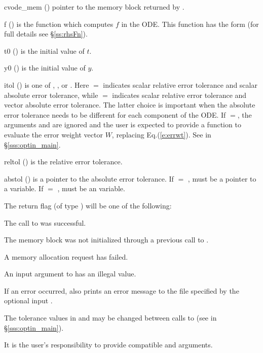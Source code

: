 {
  \begin{args}
  \item[cvode\_mem] ()
    pointer to the {\cvode} memory block returned by .
  \item[f] ()
    is the {\C} function which computes $f$ in the ODE. This function has the 
    form  (for full details see \S\ref{ss:rhsFn}).
  \item[t0] ()
    is the initial value of $t$.
  \item[y0] ()
    is the initial value of $y$. 
  \item[itol] () 
    is one of , , or . Here  $=$ 
    indicates scalar relative error tolerance and scalar absolute error tolerance,
    while  $=$  indicates scalar relative error tolerance and
    vector absolute error tolerance.  The latter choice is important when the
    absolute error tolerance needs to be different for each component of the ODE. 
    If $=$, the arguments  and  are
    ignored and the user is expected to provide a function to evaluate the error
    weight vector $W$, replacing Eq.(\ref{e:errwt}). See  in
    \S\ref{sss:optin_main}.
  \item[reltol] ()
    is the relative error tolerance.
  \item[abstol] ()
    is a pointer to the absolute error tolerance. If  $=$ ,
     must be a pointer to a  variable. If
     $=$ ,  must be an  variable.
  \end{args}
}
{
  The return flag  (of type ) will be one of the following:
  \begin{args}
  \item[\Id{CV\_SUCCESS}]
    The call to  was successful.
  \item[\Id{CV\_MEM\_NULL}] 
    The {\cvode} memory block was not initialized through a previous call
    to .
  \item[\Id{CV\_MEM\_FAIL}] 
    A memory allocation request has failed.
  \item[\Id{CV\_ILL\_INPUT}] 
    An input argument to  has an illegal value.
  \end{args}
}
{
  If an error occurred,  also prints an error message to the
  file specified by the optional input .

  The tolerance values in  and  may be changed between
  calls to  (see  in \S\ref{sss:optin_main}).

  {\warn} It is the user's responsibility to provide compatible  and
   arguments.
}
